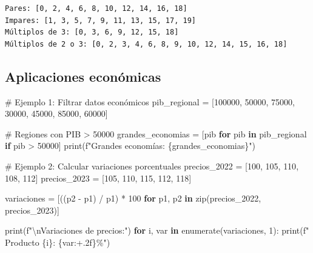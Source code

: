\documentclass[
  doc,
  floatsintext,
  longtable,
  a4paper,
  nolmodern,
  notxfonts,
  notimes,
  12pt,
  colorlinks=true,linkcolor=blue,citecolor=blue,urlcolor=blue]{apa7}
\newenvironment{Shaded}{\begin{snugshade}}{\end{snugshade}}
\newcommand{\BuiltInTok}[1]{\textcolor[rgb]{0.00,0.23,0.31}{#1}}
\newcommand{\CharTok}[1]{\textcolor[rgb]{0.13,0.47,0.30}{#1}}
\newcommand{\CommentTok}[1]{\textcolor[rgb]{0.37,0.37,0.37}{#1}}
\newcommand{\ControlFlowTok}[1]{\textcolor[rgb]{0.00,0.23,0.31}{\textbf{#1}}}
\newcommand{\DecValTok}[1]{\textcolor[rgb]{0.68,0.00,0.00}{#1}}
\newcommand{\KeywordTok}[1]{\textcolor[rgb]{0.00,0.23,0.31}{\textbf{#1}}}
\newcommand{\NormalTok}[1]{\textcolor[rgb]{0.00,0.23,0.31}{#1}}
\newcommand{\OperatorTok}[1]{\textcolor[rgb]{0.37,0.37,0.37}{#1}}
\newcommand{\SpecialCharTok}[1]{\textcolor[rgb]{0.37,0.37,0.37}{#1}}
\newcommand{\SpecialStringTok}[1]{\textcolor[rgb]{0.13,0.47,0.30}{#1}}
\begin{document}
\begin{verbatim}
Pares: [0, 2, 4, 6, 8, 10, 12, 14, 16, 18]
Impares: [1, 3, 5, 7, 9, 11, 13, 15, 17, 19]
Múltiplos de 3: [0, 3, 6, 9, 12, 15, 18]
Múltiplos de 2 o 3: [0, 2, 3, 4, 6, 8, 9, 10, 12, 14, 15, 16, 18]
\end{verbatim}

\subsection{Aplicaciones económicas}\label{aplicaciones-econuxf3micas-1}

\begin{Shaded}
\begin{Highlighting}[]
\CommentTok{\# Ejemplo 1: Filtrar datos económicos}
\NormalTok{pib\_regional }\OperatorTok{=}\NormalTok{ [}\DecValTok{100000}\NormalTok{, }\DecValTok{50000}\NormalTok{, }\DecValTok{75000}\NormalTok{, }\DecValTok{30000}\NormalTok{, }\DecValTok{45000}\NormalTok{, }\DecValTok{85000}\NormalTok{, }\DecValTok{60000}\NormalTok{]}

\CommentTok{\# Regiones con PIB \textgreater{} 50000}
\NormalTok{grandes\_economias }\OperatorTok{=}\NormalTok{ [pib }\ControlFlowTok{for}\NormalTok{ pib }\KeywordTok{in}\NormalTok{ pib\_regional }\ControlFlowTok{if}\NormalTok{ pib }\OperatorTok{\textgreater{}} \DecValTok{50000}\NormalTok{]}
\BuiltInTok{print}\NormalTok{(}\SpecialStringTok{f"Grandes economías: }\SpecialCharTok{\{}\NormalTok{grandes\_economias}\SpecialCharTok{\}}\SpecialStringTok{"}\NormalTok{)}

\CommentTok{\# Ejemplo 2: Calcular variaciones porcentuales}
\NormalTok{precios\_2022 }\OperatorTok{=}\NormalTok{ [}\DecValTok{100}\NormalTok{, }\DecValTok{105}\NormalTok{, }\DecValTok{110}\NormalTok{, }\DecValTok{108}\NormalTok{, }\DecValTok{112}\NormalTok{]}
\NormalTok{precios\_2023 }\OperatorTok{=}\NormalTok{ [}\DecValTok{105}\NormalTok{, }\DecValTok{110}\NormalTok{, }\DecValTok{115}\NormalTok{, }\DecValTok{112}\NormalTok{, }\DecValTok{118}\NormalTok{]}

\NormalTok{variaciones }\OperatorTok{=}\NormalTok{ [((p2 }\OperatorTok{{-}}\NormalTok{ p1) }\OperatorTok{/}\NormalTok{ p1) }\OperatorTok{*} \DecValTok{100} 
               \ControlFlowTok{for}\NormalTok{ p1, p2 }\KeywordTok{in} \BuiltInTok{zip}\NormalTok{(precios\_2022, precios\_2023)]}

\BuiltInTok{print}\NormalTok{(}\SpecialStringTok{f"}\CharTok{\textbackslash{}n}\SpecialStringTok{Variaciones de precios:"}\NormalTok{)}
\ControlFlowTok{for}\NormalTok{ i, var }\KeywordTok{in} \BuiltInTok{enumerate}\NormalTok{(variaciones, }\DecValTok{1}\NormalTok{):}
    \BuiltInTok{print}\NormalTok{(}\SpecialStringTok{f"  Producto }\SpecialCharTok{\{}\NormalTok{i}\SpecialCharTok{\}}\SpecialStringTok{: }\SpecialCharTok{\{}\NormalTok{var}\SpecialCharTok{:+.2f\}}\SpecialStringTok{\%"}\NormalTok{)}


\end{Highlighting}
\end{Shaded}
\end{document}
